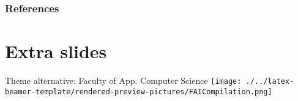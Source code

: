 \documentclass[aspectratio=169,handout]{beamer} %
\begin{document}
    \begin{frame}
        \frametitle{References}
        \nocite{*}
        \printbibliography[title={Bibliography}]
    \end{frame}
    
    \section*{Extra slides}
        \begin{frame}[noframenumbering]{Theme alternative: Faculty of App. Computer Science}
            \hspace{1cm}\texttt{[image: ./../latex-beamer-template/rendered-preview-pictures/FAICompilation.png]}
        \end{frame}
\end{document}
